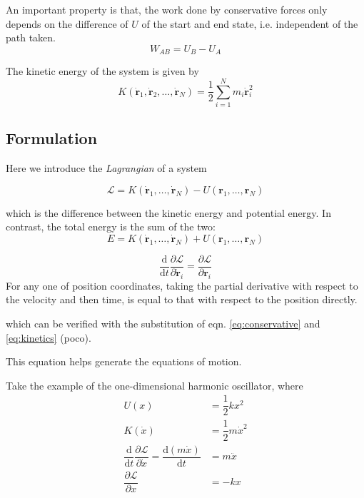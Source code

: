 \documentclass[
  10pt,
  twoside,
  openany,
  b5paper, %
  colorscheme = bootstrap-v4, %
]{qyxf-book}
\numberwithin{equation}{section}
\newcommand{\md}{\mathrm{d}}
\newcommand{\der}[2]{\dfrac{\md #1}{\md #2}}
\newcommand{\p}[2]{\dfrac{\partial #1}{\partial #2}}
\newcommand{\vF}{\boldsymbol{F}}
\newcommand{\vr}{\boldsymbol{r}}
\newcommand{\vl}{\boldsymbol{l}}
\newcommand{\dvr}{\dot{\vr}}
\newcommand{\half}{\dfrac{1}{2}}
\newcommand{\lag}{\mathcal{L}} %
\begin{document}
An important property is that, the work done by conservative forces only depends on the difference of $U$ of the start and end state, i.e. independent of the path taken. 
$$
W_{AB}=U_B-U_A
$$

The kinetic energy of the system is given by
\begin{equation}
	K(\dvr_1, \dvr_2, \dots, \dvr_N)=\half\sum_{i=1}^{N}m_i\dvr_i^2 \label{eq:kinetics}
\end{equation}

\subsection{Formulation}
Here we introduce the \textit{Lagrangian} of a system
\begin{tcolorbox}
	\begin{equation}
		\lag=K(\dvr_1, \dots, \dvr_N)-U(\vr_1, \dots, \vr_N)
	\end{equation}
\end{tcolorbox}
which is the difference between the kinetic energy and potential energy. In contrast, the total energy is the sum of the two:
\begin{equation}
	E=K(\dvr_1, \dots, \dvr_N)+U(\vr_1, \dots, \vr_N)
\end{equation}

\begin{tcolorbox}[title={The Euler-Lagrange equation}]
	\begin{equation}
		\der{}{t}\p{\lag}{\dvr_i}=\p{\lag}{\vr_i} \label{eq:euler-lagrange}
	\end{equation}
	For any one of position coordinates, taking the partial derivative with respect to the velocity and then time, is equal to that with respect to the position directly.
\end{tcolorbox}
which can be verified with the substitution of eqn. \ref{eq:conservative} and \ref{eq:kinetics} (poco).

This equation helps generate the equations of motion. 

\example
Take the example of the one-dimensional harmonic oscillator, where
\begin{align*}
	U(x)&=\half kx^2\\
	K(\dot{x})&=\half m\dot{x}^2\\
	\der{}{t}\p{\lag}{\dot{x}}=\der{(m\dot{x})}{t}&=m\ddot{x}\\
	\p{\lag}{x}&=-kx
\end{align*}
\end{document}
